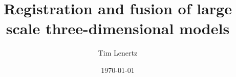 \documentclass[a4paper,10pt]{scrreprt}
\begin{document}
\title{Registration and fusion of large scale three-dimensional models}
\author{Tim Lenertz}
\date{\today}
\maketitle

\tableofcontents







\appendix




\end{document}
